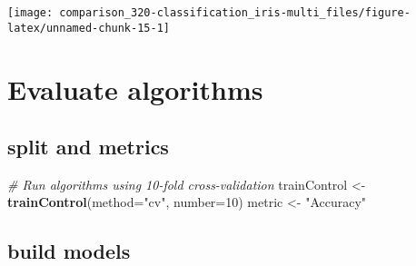 \documentclass[]{book}
\newenvironment{Shaded}{\begin{snugshade}}{\end{snugshade}}
\newcommand{\CommentTok}[1]{\textcolor[rgb]{0.56,0.35,0.01}{\textit{#1}}}
\newcommand{\DataTypeTok}[1]{\textcolor[rgb]{0.13,0.29,0.53}{#1}}
\newcommand{\DecValTok}[1]{\textcolor[rgb]{0.00,0.00,0.81}{#1}}
\newcommand{\KeywordTok}[1]{\textcolor[rgb]{0.13,0.29,0.53}{\textbf{#1}}}
\newcommand{\NormalTok}[1]{#1}
\newcommand{\StringTok}[1]{\textcolor[rgb]{0.31,0.60,0.02}{#1}}
\begin{document}
\begin{center}\texttt{[image: comparison\_320-classification\_iris-multi\_files/figure-latex/unnamed-chunk-15-1]} \end{center}

\hypertarget{evaluate-algorithms}{%
\section{Evaluate algorithms}\label{evaluate-algorithms}}

\hypertarget{split-and-metrics}{%
\subsection{split and metrics}\label{split-and-metrics}}

\begin{Shaded}
\begin{Highlighting}[]
\CommentTok{# Run algorithms using 10-fold cross-validation}
\NormalTok{trainControl <-}\StringTok{ }\KeywordTok{trainControl}\NormalTok{(}\DataTypeTok{method=}\StringTok{"cv"}\NormalTok{, }\DataTypeTok{number=}\DecValTok{10}\NormalTok{)}
\NormalTok{metric <-}\StringTok{ "Accuracy"}
\end{Highlighting}
\end{Shaded}

\hypertarget{build-models}{%
\subsection{build models}\label{build-models}}
\end{document}
